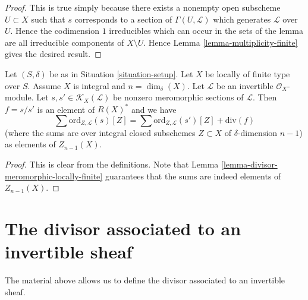 \begin{proof}
This is true simply because there exists a nonempty open subscheme
$U \subset X$ such that $s$ corresponds to a section of
$\Gamma(U, \mathcal{L})$ which generates $\mathcal{L}$ over $U$.
Hence the codimension $1$
irreducibles which can occur in the sets of the lemma are all
irreducible components of $X \setminus U$.
Hence Lemma \ref{lemma-multiplicity-finite} gives the desired result.
\end{proof}

\begin{lemma}
\label{lemma-divisor-meromorphic-well-defined}
Let $(S, \delta)$ be as in Situation \ref{situation-setup}.
Let $X$ be locally of finite type over $S$. Assume $X$ is
integral and $n = \dim_\delta(X)$.
Let $\mathcal{L}$ be an invertible $\mathcal{O}_X$-module.
Let $s, s' \in \mathcal{K}_X(\mathcal{L})$ be nonzero
meromorphic sections of $\mathcal{L}$. Then $f = s/s'$
is an element of $R(X)^*$ and we have
$$
\sum \text{ord}_{Z, \mathcal{L}}(s)[Z]
=
\sum \text{ord}_{Z, \mathcal{L}}(s')[Z]
+
\text{div}(f)
$$
(where the sums are over integral closed subschemes $Z \subset X$
of $\delta$-dimension $n - 1$) as elements of $Z_{n - 1}(X)$.
\end{lemma}

\begin{proof}
This is clear from the definitions.
Note that Lemma \ref{lemma-divisor-meromorphic-locally-finite}
guarantees that the sums are indeed
elements of $Z_{n - 1}(X)$.
\end{proof}









\section{The divisor associated to an invertible sheaf}
\label{section-divisor-invertible-sheaf}

\noindent
The material above allows us to define the divisor
associated to an invertible sheaf.

